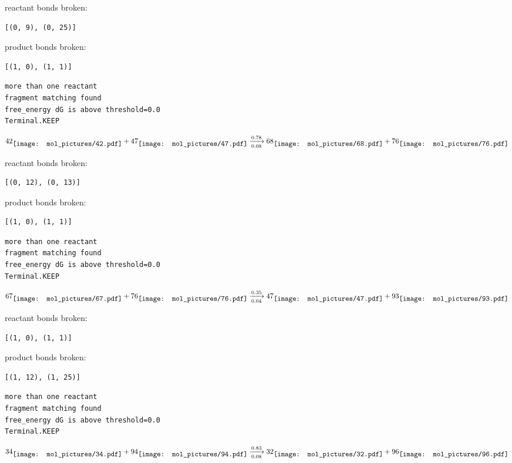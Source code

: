 \documentclass{article}
\begin{document}
reactant bonds broken:\begin{verbatim}
[(0, 9), (0, 25)]
\end{verbatim}
product bonds broken:\begin{verbatim}
[(1, 0), (1, 1)]
\end{verbatim}




\vspace{1cm}
\begin{verbatim}
more than one reactant
fragment matching found
free_energy dG is above threshold=0.0
Terminal.KEEP
\end{verbatim}
$$
42
\raisebox{-.5\height}{\texttt{[image: mol\_pictures/42.pdf]}}
+
47
\raisebox{-.5\height}{\texttt{[image: mol\_pictures/47.pdf]}}
\xrightarrow[0.08]{0.78}
68
\raisebox{-.5\height}{\texttt{[image: mol\_pictures/68.pdf]}}
+
76
\raisebox{-.5\height}{\texttt{[image: mol\_pictures/76.pdf]}}
$$


reactant bonds broken:\begin{verbatim}
[(0, 12), (0, 13)]
\end{verbatim}
product bonds broken:\begin{verbatim}
[(1, 0), (1, 1)]
\end{verbatim}




\vspace{1cm}
\begin{verbatim}
more than one reactant
fragment matching found
free_energy dG is above threshold=0.0
Terminal.KEEP
\end{verbatim}
$$
67
\raisebox{-.5\height}{\texttt{[image: mol\_pictures/67.pdf]}}
+
76
\raisebox{-.5\height}{\texttt{[image: mol\_pictures/76.pdf]}}
\xrightarrow[0.04]{0.35}
47
\raisebox{-.5\height}{\texttt{[image: mol\_pictures/47.pdf]}}
+
93
\raisebox{-.5\height}{\texttt{[image: mol\_pictures/93.pdf]}}
$$


reactant bonds broken:\begin{verbatim}
[(1, 0), (1, 1)]
\end{verbatim}
product bonds broken:\begin{verbatim}
[(1, 12), (1, 25)]
\end{verbatim}




\vspace{1cm}
\begin{verbatim}
more than one reactant
fragment matching found
free_energy dG is above threshold=0.0
Terminal.KEEP
\end{verbatim}
$$
34
\raisebox{-.5\height}{\texttt{[image: mol\_pictures/34.pdf]}}
+
94
\raisebox{-.5\height}{\texttt{[image: mol\_pictures/94.pdf]}}
\xrightarrow[0.08]{0.83}
32
\raisebox{-.5\height}{\texttt{[image: mol\_pictures/32.pdf]}}
+
96
\raisebox{-.5\height}{\texttt{[image: mol\_pictures/96.pdf]}}
$$
\end{document}
